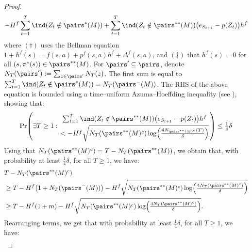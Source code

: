 \documentclass[preprint,cleveref,12pt]{colt2025}
\DeclarePairedDelimiter{\parens}{(}{)}	%
\newcommand{\indic}[1]{\ind\parens{#1}}
\def\indicator{\indic}
\begin{document}
\begin{proof}
\begin{align*}
            - H^f \sum_{t=1}^T \indicator{Z_t \notin \pairs^*(M)}
            + \sum_{t=1}^T \indicator{Z_t \notin \pairs^{**}(M)} \parens*{e_{S_{t+1}} - p(Z_t)} h^f
        \end{align*}
        where $(\dagger)$ uses the Bellman equation $1 + h^f(s) = f(s,a) + p^f(s,a) h^f + \Delta^f(s,a)$, and $(\ddagger)$ that $h^f(s) = 0$ for all $(s, \pi^*(s)) \in \pairs^{**}(M)$.
        For $\pairs' \subseteq \pairs$, denote $N_T({\pairs'}) := \sum_{z \in \pairs'} N_T(z)$.
        The first sum is equal to $\sum_{t=1}^T \indicator{Z_t \notin \pairs^{*}(M)} = N_T({\pairs^-(M)})$.
        The RHS of the above equation is bounded using a time--uniform Azuma--Hoeffding inequality (see \cite[Lemma~5]{bourel_tightening_2020}), showing that:
        \begin{equation*}
            \Pr \parens*{
                \exists T \ge 1:
                {
                    \sum_{t=1}^T \indicator{Z_t \notin \pairs^{**}(M)} \parens*{e_{S_{t+1}} - p(Z_t)} h^f
                    \atop
                    <
                    - H^f \sqrt{
                        N_T({\pairs^{**}(M)^c})
                        \log\parens*{
                            \tfrac{4N_{\pairs^{**}(M)^c}(T)}{\delta}
                        }
                    }
                }
            }
            \le
            \tfrac 14 \delta
        \end{equation*}
        Using that $N_T({\pairs^{**}(M)^c}) = T - N_T({\pairs^{**}(M)})$, we obtain that, with probability at least $\tfrac 14 \delta$, for all $T \ge 1$, we have:
        \begin{align*}
            & T - N_T({\pairs^{**}(M)^c})
            \\
            & \ge
            T 
            - H^f \parens*{1 + N_T({\pairs^-(M)})}
            - H^f \sqrt{
                N_T({\pairs^{**}(M)^c})
                \log\parens*{
                    \tfrac{4N_T({\pairs^{**}(M)^c})}{\delta}
                }
            }
            \\
            & \ge 
            T 
            - H^f \parens*{1 + m}
            - H^f \sqrt{
                N_T({\pairs^{**}(M)^c})
                \log\parens*{
                    \tfrac{4N_T({\pairs^{**}(M)^c})}{\delta}
                }
            }
            .
        \end{align*}
        Rearranging terms, we get that with probability at least $\tfrac 14\delta$, for all $T \ge 1$, we have:
        \begin{align*}

\end{align*}
\end{proof}
\end{document}
